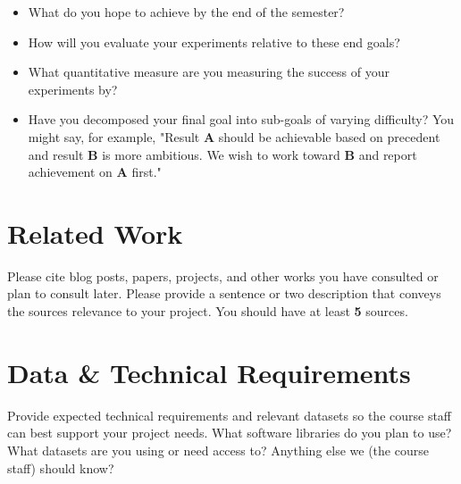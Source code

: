 \documentclass{article}
\begin{document}
\begin{itemize}
\item What do you hope to achieve by the end of the semester?
\item How will you evaluate your experiments relative to these end goals?
\item What quantitative measure are you measuring the success of your experiments by?
\item Have you decomposed your final goal into sub-goals of varying difficulty? You might say, for example, "Result \textbf{A} should be achievable based on precedent and result \textbf{B} is more ambitious. We wish to work toward \textbf{B} and report achievement on \textbf{A} first."
\end{itemize}

\section{Related Work}

Please cite blog posts, papers, projects, and other works you have consulted or plan to consult later. Please provide a sentence or two description that conveys the sources relevance to your project. You should have at least \textbf{5} sources.


\section{Data \& Technical Requirements}

Provide expected technical requirements and relevant datasets so the course staff can best support your project needs. What software libraries do you plan to use? What datasets are you using or need access to? Anything else we (the course staff) should know?

\nocite{Bengio+chapter2007}
\nocite{Hinton06}



\end{document}
